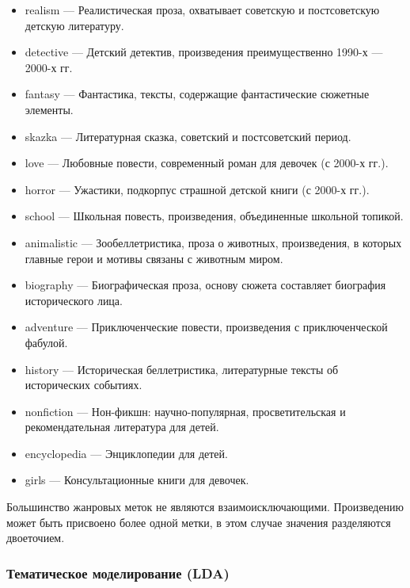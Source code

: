 \documentclass[
]{article}
\providecommand{\tightlist}{%
  \setlength{\itemsep}{0pt}\setlength{\parskip}{0pt}}
\begin{document}
\begin{itemize}
\tightlist
\item
  realism --- Реалистическая проза, охватывает советскую и постсоветскую
  детскую литературу.
\item
  detective --- Детский детектив, произведения преимущественно 1990-х
  --- 2000-х гг.
\item
  fantasy --- Фантастика, тексты, содержащие фантастические сюжетные
  элементы.
\item
  skazka --- Литературная сказка, советский и постсоветский период.
\item
  love --- Любовные повести, современный роман для девочек (с 2000-х
  гг.).
\item
  horror --- Ужастики, подкорпус страшной детской книги (с 2000-х гг.).
\item
  school --- Школьная повесть, произведения, объединенные школьной
  топикой.
\item
  animalistic --- Зообеллетристика, проза о животных, произведения, в
  которых главные герои и мотивы связаны с животным миром.
\item
  biography --- Биографическая проза, основу сюжета составляет биография
  исторического лица.
\item
  adventure --- Приключенческие повести, произведения с приключенческой
  фабулой.
\item
  history --- Историческая беллетристика, литературные тексты об
  исторических событиях.
\item
  nonfiction --- Нон-фикшн: научно-популярная, просветительская и
  рекомендательная литература для детей.
\item
  encyclopedia --- Энциклопедии для детей.
\item
  girls --- Консультационные книги для девочек.
\end{itemize}

Большинство жанровых меток не являются взаимоисключающими. Произведению
может быть присвоено более одной метки, в этом случае значения
разделяются двоеточием.

\hypertarget{ux442ux435ux43cux430ux442ux438ux447ux435ux441ux43aux43eux435-ux43cux43eux434ux435ux43bux438ux440ux43eux432ux430ux43dux438ux435-lda}{%
\subsubsection{Тематическое моделирование
(LDA)}\label{ux442ux435ux43cux430ux442ux438ux447ux435ux441ux43aux43eux435-ux43cux43eux434ux435ux43bux438ux440ux43eux432ux430ux43dux438ux435-lda}}
\end{document}
